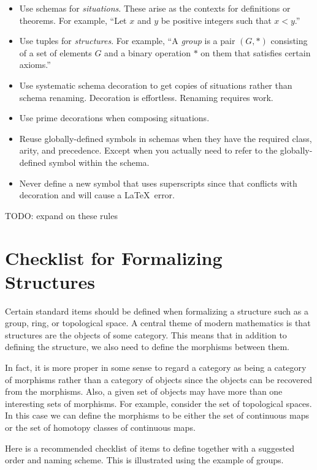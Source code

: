 \documentclass{amsart}
\begin{document}
\begin{itemize}
	\item Use schemas for \textit{situations}. These arise as the contexts for definitions or theorems.
	For example, ``Let $x$ and $y$ be positive integers such that $x < y$.''
	\item Use tuples for \textit{structures}. For example, ``A \textit{group} is a pair $(G, *)$ 
	consisting of a set of elements $G$
	and a binary operation $*$ on them that satisfies certain axioms.''
	\item Use systematic schema decoration to get copies of situations rather than schema renaming.
	Decoration is effortless. Renaming requires work.
	\item Use prime decorations when composing situations.
	\item Reuse globally-defined symbols in schemas when they have the required class, arity, and precedence.
	Except when you actually need to refer to the globally-defined symbol within the schema.
	\item Never define a new symbol that uses superscripts since that conflicts with decoration and will cause
	a \LaTeX\ error.
\end{itemize}

TODO: expand on these rules

\section{Checklist for Formalizing Structures}

Certain standard items should be defined when formalizing a structure such as a group, ring, or topological space.
A central theme of modern mathematics is that structures are the objects of some category.
This means that in addition to defining the structure, we also need to define the morphisms
between them. 

In fact, it is more proper in some sense to regard a category as being a category of morphisms
rather than a category of objects since the objects can be recovered from the morphisms.
Also, a given set of objects may have more than one interesting sets of morphisms.
For example, consider the set of topological spaces. 
In this case we can define the morphisms to be either the set of continuous maps or the set of homotopy classes
of continuous maps.

Here is a recommended checklist of items to define together with a suggested order and naming scheme.
This is illustrated using the example of groups.
\end{document}
